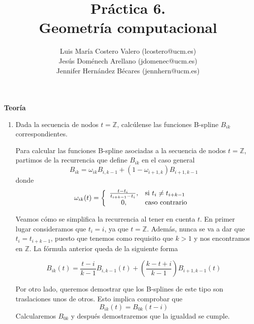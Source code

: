 \documentclass[12pt,a4paper]{article}
\title{Práctica 6. \\ Geometría computacional}
\author{Luis María Costero Valero (lcostero@ucm.es)\\ Jesús Doménech
  Arellano (jdomenec@ucm.es) \\ Jennifer Hernández Bécares (jennhern@ucm.es)}
\date{}
\begin{document}
\maketitle
\onehalfspace

\begin{center}
  {\textbf{Teoría}}
\end{center}
\begin{enumerate}



  \item Dada la secuencia de nodos $t=\mathbb{Z}$, calcúlense las
  funciones B-spline $B_{ik}$ correspondientes.

  Para calcular las funciones B-spline asociadas a la secuencia de
  nodos $t=\mathbb{Z}$, partimos de la recurrencia que define $B_{ik}$
  en el caso general
  \begin{equation}
    B_{ik}=\omega_{ik}B_{i,k-1}+(1-\omega_{i+1,k})B_{i+1,k-1}
  \end{equation}
  donde
  \begin{equation}
    \omega_{ik}(t)=
    \left\lbrace
    \begin{array}{c l}
      \frac{t-t_i}{t_{i+k-1}-t_i}, & $si $t_i\neq t_{i+k-1}\\
      0, & $caso contrario $ \\
    \end{array}
    \right.
  \end{equation}

  Veamos cómo se simplifica la recurrencia al tener en cuenta $t$. En primer lugar
  consideramos que $t_i=i$, ya que $t=\mathbb{Z}$. Además, nunca se va
  a dar que $t_{i}=t_{i+k-1}$, puesto que tenemos como requisito que
  $k>1$ y nos encontramos en $\mathbb{Z}$. La fórmula anterior queda
  de la siguiente forma

  \begin{equation}
    B_{ik}(t)=\frac{t-i}{k-1}B_{i,k-1}(t)+(\frac{k-t+i}{k-1})B_{i+1,k-1}(t)
  \end{equation}

  Por otro lado, queremos demostrar que los B-splines de este tipo son
  traslaciones unos de otros. Esto implica comprobar que
  \begin{equation}
    \label{eq:1}
    B_{ik}(t)=B_{0k}(t-i)
  \end{equation}
  Calcularemos $B_{0k}$ y después
  demostraremos que la igualdad se cumple. \\


\end{enumerate}
\end{document}
